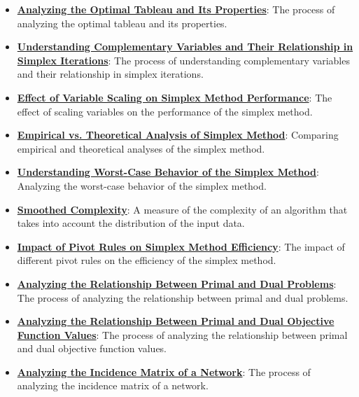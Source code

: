 \documentclass{article}%
\begin{document}
\begin{itemize}[leftmargin=*]
\item \href{https://www.math.purdue.edu/~yipn/421/2024-11-14-NetAppls.pdf#page=7}{\textbf{Analyzing the Optimal Tableau and Its Properties}}: The process of analyzing the optimal tableau and its properties.%
\item \href{https://www.math.purdue.edu/~yipn/421/2024-11-14-NetAppls.pdf#page=7}{\textbf{Understanding Complementary Variables and Their Relationship in Simplex Iterations}}: The process of understanding complementary variables and their relationship in simplex iterations.%
\item \href{https://www.math.purdue.edu/~yipn/421/2024-11-14-NetAppls.pdf#page=7}{\textbf{Effect of Variable Scaling on Simplex Method Performance}}: The effect of scaling variables on the performance of the simplex method.%
\item \href{https://www.math.purdue.edu/~yipn/421/2024-11-14-NetAppls.pdf#page=7}{\textbf{Empirical vs. Theoretical Analysis of Simplex Method}}: Comparing empirical and theoretical analyses of the simplex method.%
\item \href{https://www.math.purdue.edu/~yipn/421/2024-11-14-NetAppls.pdf#page=7}{\textbf{Understanding Worst{-}Case Behavior of the Simplex Method}}: Analyzing the worst-case behavior of the simplex method.%
\item \href{https://www.math.purdue.edu/~yipn/421/2024-11-14-NetAppls.pdf#page=7}{\textbf{Smoothed Complexity}}: A measure of the complexity of an algorithm that takes into account the distribution of the input data.%
\item \href{https://www.math.purdue.edu/~yipn/421/2024-11-14-NetAppls.pdf#page=7}{\textbf{Impact of Pivot Rules on Simplex Method Efficiency}}: The impact of different pivot rules on the efficiency of the simplex method.%
\item \href{https://www.math.purdue.edu/~yipn/421/2024-11-14-NetAppls.pdf#page=7}{\textbf{Analyzing the Relationship Between Primal and Dual Problems}}: The process of analyzing the relationship between primal and dual problems.%
\item \href{https://www.math.purdue.edu/~yipn/421/2024-11-14-NetAppls.pdf#page=7}{\textbf{Analyzing the Relationship Between Primal and Dual Objective Function Values}}: The process of analyzing the relationship between primal and dual objective function values.%
\item \href{https://www.math.purdue.edu/~yipn/421/2024-11-14-NetAppls.pdf#page=7}{\textbf{Analyzing the Incidence Matrix of a Network}}: The process of analyzing the incidence matrix of a network.%

\end{itemize}
\end{document}
